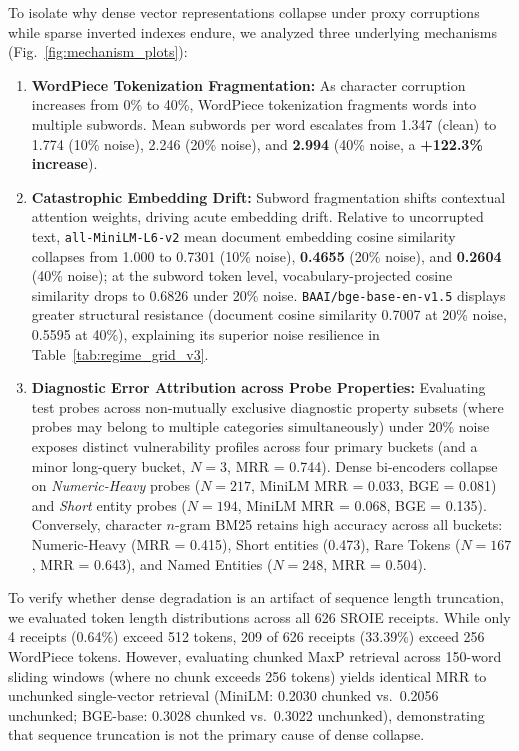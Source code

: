 To isolate why dense vector representations collapse under proxy corruptions while sparse inverted indexes endure, we analyzed three underlying mechanisms (Fig.~\ref{fig:mechanism_plots}):
\begin{enumerate}
    \setlength{\itemsep}{0.2pt plus 0.1pt}
    \setlength{\parskip}{0pt}
    \item \textbf{WordPiece Tokenization Fragmentation:} As character corruption increases from 0\% to 40\%, WordPiece tokenization fragments words into multiple subwords. Mean subwords per word escalates from 1.347 (clean) to 1.774 (10\% noise), 2.246 (20\% noise), and \textbf{2.994} (40\% noise, a \textbf{+122.3\% increase}).
    \item \textbf{Catastrophic Embedding Drift:} Subword fragmentation shifts contextual attention weights, driving acute embedding drift. Relative to uncorrupted text, \texttt{all-MiniLM-L6-v2} mean document embedding cosine similarity collapses from 1.000 to 0.7301 (10\% noise), \textbf{0.4655} (20\% noise), and \textbf{0.2604} (40\% noise); at the subword token level, vocabulary-projected cosine similarity drops to 0.6826 under 20\% noise. \texttt{BAAI/bge-base-en-v1.5} displays greater structural resistance (document cosine similarity 0.7007 at 20\% noise, 0.5595 at 40\%), explaining its superior noise resilience in Table~\ref{tab:regime_grid_v3}.
    \item \textbf{Diagnostic Error Attribution across Probe Properties:} Evaluating test probes across non-mutually exclusive diagnostic property subsets (where probes may belong to multiple categories simultaneously) under 20\% noise exposes distinct vulnerability profiles across four primary buckets (and a minor long-query bucket, $N=3$, MRR = 0.744). Dense bi-encoders collapse on \emph{Numeric-Heavy} probes ($N=217$, MiniLM MRR = 0.033, BGE = 0.081) and \emph{Short} entity probes ($N=194$, MiniLM MRR = 0.068, BGE = 0.135). Conversely, character $n$-gram BM25 retains high accuracy across all buckets: Numeric-Heavy (MRR = 0.415), Short entities (0.473), Rare Tokens ($N=167$, MRR = 0.643), and Named Entities ($N=248$, MRR = 0.504).
\end{enumerate}

To verify whether dense degradation is an artifact of sequence length truncation, we evaluated token length distributions across all 626 SROIE receipts. While only 4 receipts (0.64\%) exceed 512 tokens, 209 of 626 receipts (33.39\%) exceed 256 WordPiece tokens. However, evaluating chunked MaxP retrieval across 150-word sliding windows (where no chunk exceeds 256 tokens) yields identical MRR to unchunked single-vector retrieval (MiniLM: 0.2030 chunked vs.\ 0.2056 unchunked; BGE-base: 0.3028 chunked vs.\ 0.3022 unchunked), demonstrating that sequence truncation is not the primary cause of dense collapse.

